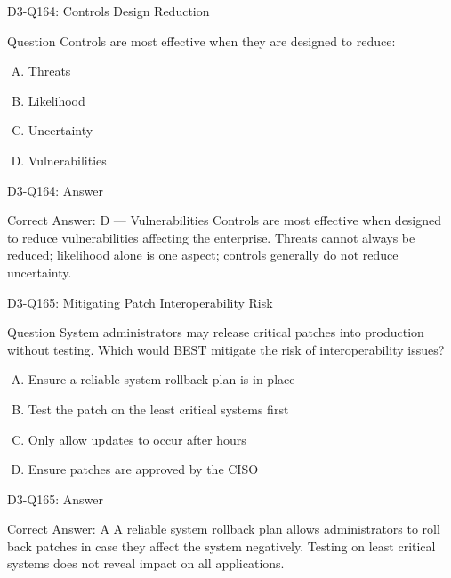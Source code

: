 \documentclass{beamer}
\begin{document}
	\begin{frame}{D3-Q164: Controls Design Reduction}
		\begin{block}{Question}
			Controls are most effective when they are designed to reduce:
		\end{block}
		\begin{enumerate}[(A)]
			\item Threats
			\item Likelihood
			\item Uncertainty
			\item Vulnerabilities
		\end{enumerate}
	\end{frame}
	\begin{frame}{D3-Q164: Answer}
		\begin{block}{Correct Answer: D --- Vulnerabilities}
			Controls are most effective when designed to reduce vulnerabilities affecting the enterprise. Threats cannot always be reduced; likelihood alone is one aspect; controls generally do not reduce uncertainty.
		\end{block}
	\end{frame}
	
	\begin{frame}{D3-Q165: Mitigating Patch Interoperability Risk}
		\begin{block}{Question}
			System administrators may release critical patches into production without testing. Which would BEST mitigate the risk of interoperability issues?
		\end{block}
		\begin{enumerate}[(A)]
			\item Ensure a reliable system rollback plan is in place
			\item Test the patch on the least critical systems first
			\item Only allow updates to occur after hours
			\item Ensure patches are approved by the CISO
		\end{enumerate}
	\end{frame}
	\begin{frame}{D3-Q165: Answer}
		\begin{block}{Correct Answer: A}
			A reliable system rollback plan allows administrators to roll back patches in case they affect the system negatively. Testing on least critical systems does not reveal impact on all applications.
		\end{block}
	\end{frame}
	
\end{document}
